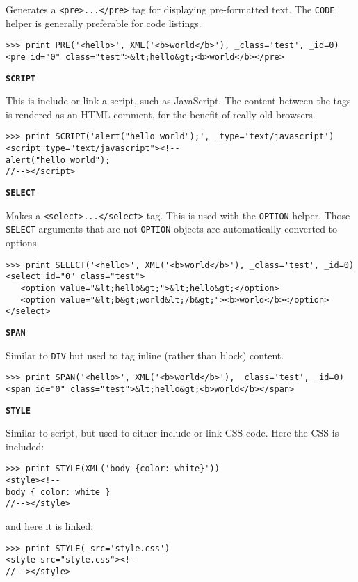 \documentclass[justified,sixbynine,notoc]{tufte-book}
\def\ft{\small\tt}
\def\inxx#1{\index{#1}}
\begin{document}
\begin{fullwidth}
Generates a {\ft <pre>...</pre>} tag for displaying pre-formatted text. The {\ft CODE} helper is generally preferable for code listings.
\begin{lstlisting}
>>> print PRE('<hello>', XML('<b>world</b>'), _class='test', _id=0)
<pre id="0" class="test">&lt;hello&gt;<b>world</b></pre>
\end{lstlisting}

{\bf {\ft SCRIPT}}

\inxx{SCRIPT}

This is include or link a script, such as JavaScript. The content between the tags is rendered as an HTML comment, for the benefit of really old browsers.
\begin{lstlisting}
>>> print SCRIPT('alert("hello world");', _type='text/javascript')
<script type="text/javascript"><!--
alert("hello world");
//--></script>
\end{lstlisting}

{\bf {\ft SELECT}}

\inxx{SELECT}

Makes a {\ft <select>...</select>} tag. This is used with the {\ft OPTION} helper. Those {\ft SELECT} arguments that are not {\ft OPTION} objects are automatically converted to options.
\begin{lstlisting}
>>> print SELECT('<hello>', XML('<b>world</b>'), _class='test', _id=0)
<select id="0" class="test">
   <option value="&lt;hello&gt;">&lt;hello&gt;</option>
   <option value="&lt;b&gt;world&lt;/b&gt;"><b>world</b></option>
</select>
\end{lstlisting}

{\bf {\ft SPAN}}

\inxx{SPAN}

Similar to {\ft DIV} but used to tag inline (rather than block) content.
\begin{lstlisting}
>>> print SPAN('<hello>', XML('<b>world</b>'), _class='test', _id=0)
<span id="0" class="test">&lt;hello&gt;<b>world</b></span>
\end{lstlisting}

{\bf {\ft STYLE}}

\inxx{STYLE}

Similar to script, but used to either include or link CSS code.
Here the CSS is included:
\begin{lstlisting}
>>> print STYLE(XML('body {color: white}'))
<style><!--
body { color: white }
//--></style>
\end{lstlisting}
\noindent and here it is linked:
\begin{lstlisting}
>>> print STYLE(_src='style.css')
<style src="style.css"><!--
//--></style>
\end{lstlisting}


\end{fullwidth}
\end{document}
